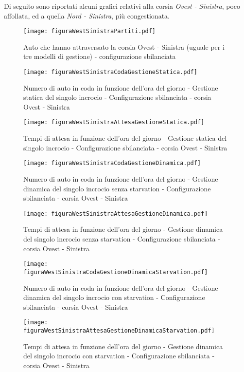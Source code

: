 Di seguito sono riportati alcuni grafici relativi alla corsia \textit{Ovest - Sinistra}, poco affollata, ed a quella \textit{Nord - Sinistra}, più congestionata.
\newpage
\begin{figure}[H]
\centering
  \texttt{[image: figuraWestSinistraPartiti.pdf]}
  \caption{Auto che hanno attraversato la corsia Ovest - Sinistra (uguale per i tre modelli di gestione) - configurazione sbilanciata}
  \label{fig:partitiMuSbil}
\end{figure}
\begin{figure}[H]
\centering
  \texttt{[image: figuraWestSinistraCodaGestioneStatica.pdf]}
  \caption{Numero di auto in coda in funzione dell'ora del giorno - Gestione statica del singolo incrocio - Configurazione sbilanciata - corsia Ovest - Sinistra}
  \label{fig:}
\end{figure}

\newpage

\begin{figure}[H]
\centering
  \texttt{[image: figuraWestSinistraAttesaGestioneStatica.pdf]}
  \caption{Tempi di attesa in funzione dell'ora del giorno - Gestione statica del singolo incrocio - Configurazione sbilanciata - corsia Ovest - Sinistra}
  \label{fig:}
\end{figure}
\begin{figure}[H]
\centering
  \texttt{[image: figuraWestSinistraCodaGestioneDinamica.pdf]}
  \caption{Numero di auto in coda in funzione dell'ora del giorno - Gestione dinamica del singolo incrocio senza starvation - Configurazione sbilanciata - corsia Ovest - Sinistra}
  \label{fig:}
\end{figure}

\newpage

\begin{figure}[H]
\centering
  \texttt{[image: figuraWestSinistraAttesaGestioneDinamica.pdf]}
  \caption{Tempi di attesa in funzione dell'ora del giorno - Gestione dinamica del singolo incrocio senza starvation - Configurazione sbilanciata - corsia Ovest - Sinistra}
  \label{fig:}
\end{figure}
\begin{figure}[H]
\centering
  \texttt{[image: figuraWestSinistraCodaGestioneDinamicaStarvation.pdf]}
  \caption{Numero di auto in coda in funzione dell'ora del giorno - Gestione dinamica del singolo incrocio con starvation - Configurazione sbilanciata - corsia Ovest - Sinistra}
  \label{fig:}
\end{figure}
\newpage
\begin{figure}[H]
\centering
  \texttt{[image: figuraWestSinistraAttesaGestioneDinamicaStarvation.pdf]}
  \caption{Tempi di attesa in funzione dell'ora del giorno - Gestione dinamica del singolo incrocio con starvation - Configurazione sbilanciata - corsia Ovest - Sinistra}
  \label{fig:}
\end{figure}

